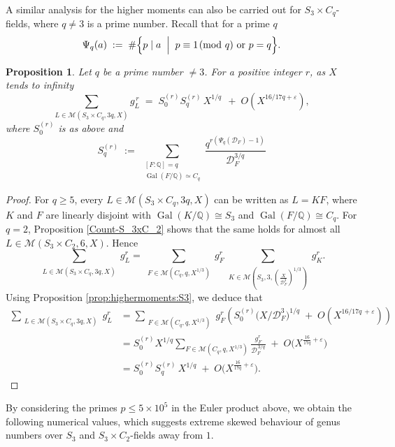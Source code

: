 \documentclass[11pt,reqno]{amsart}
\newcommand{\Q}{\mathbb{Q}}
\newcommand{\cD}{\mathcal{D}}
\newcommand{\cM}{\mathcal{M}}
\DeclareMathOperator{\Gal}{Gal}
\newtheorem{proposition}[theorem]{Proposition}
\theoremstyle{definition}
\theoremstyle{remark}
\begin{document}
A similar analysis for the higher moments can also be carried out for $S_3\times C_q$- fields, where $q\neq 3$ is a prime number. Recall that for a prime $q$
\[
\Psi_q(a)
  \;:=\;
  \#\Bigl\{
      p \mid a
      \;\Bigm|\;
      p \equiv 1 \!\!\pmod{q}
      \ \text{or}\
      p = q
    \Bigr\}.
\]
\begin{proposition}\label{higher-moments-S_3XC_q}
Let $q$ be a prime number $\neq  3$. For a positive integer $r$, as $X$ tends to infinity
    \[
\displaystyle
\sum_{L\in\cM(S_3\times C_q, 3q, X)}
g_L^{\,r}
   \;=\;
 {S_0^{(r)} S_q^{(r)}}\,X^{1/q}\,
   \;+\; O\!\left(X^{16/17q+\varepsilon}\right),
\]
where $S_0^{(r)}$ is as above and
\[
S_q^{(r)}
   \;:=\;
   \sum_{\substack{[F:\Q]=q \\ \Gal(F/\Q)\simeq C_q}}
  \frac{q^{ r \left( \Psi_q(\cD_F)-1\right)}}{\cD_F^{3/q}}
\]
\end{proposition} 
\begin{proof}
    For $q \ge 5$, every $L \in \cM(S_3 \times C_q, 3q, X)$ can be written as $L = KF$, where $K$ and $F$ are linearly disjoint with $\Gal(K/\Q) \cong S_3$ and $\Gal(F/\Q) \cong C_q$. For $q = 2$, Proposition \ref{Count-S_3xC_2} shows that the same holds for almost all $L \in \cM(S_3 \times C_2, 6, X)$.  Hence
    \begin{equation*}
        \sum_{\substack{L \in \cM(S_3\times C_q, 3q, X)}} g_L^r = \sum_{\substack{F \in \cM(C_q, q, X^{1/3})}} g_F^r \sum_{\substack{K \in \cM\left(S_3, 3, \left(\frac{X}{\cD_F^3}\right)^{1/3}\right)}} g_K^r.
    \end{equation*}
    Using Proposition \ref{prop:highermoments:S3}, we deduce that
    \begin{align*}
        \sum_{\substack{L \in \cM(S_3\times C_q, 3q, X)}} g_L^r &=
        \sum_{\substack{F \in \cM(C_q, q, X^{1/3})}} g_F^r  \left( S_0^{(r)}
	\bigl(X/\mathcal{D}_F^{3}\bigr)^{1/q} \;+\;
	O\!\left(X^{16/17q\,+\varepsilon}\right)
	\right)\\
    &= S_0^{(r)} X^{1/q} \sum_{F\in \cM(C_q,q, X^{1/3})}
\frac{g_F^r}{\mathcal{D}_F^{\,3/q}} \;+\;
O\bigl(X^{\frac{16}{17q}+\varepsilon}\bigr)\\
    & = S_0^{(r)} S_q^{(r)}\,X^{1/q}
\;+\;
O\bigl(X^{\frac{16}{17q}+\varepsilon}\bigr). 
    \end{align*}
    \end{proof}
\smallskip    

By considering the primes $p \le 5\times 10^5$ in the Euler product above, we obtain the following numerical values, which suggests extreme skewed behaviour of genus numbers over $S_3$ and $S_3\times C_2$-fields away from $1$.
\end{document}
